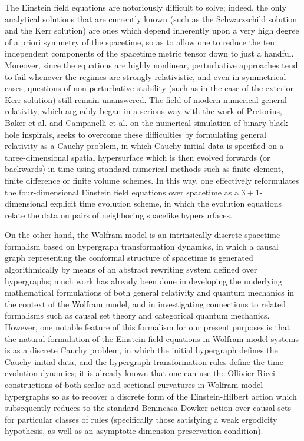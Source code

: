 \documentclass{article}
\begin{document}
The Einstein field equations are notoriously difficult to solve; indeed, the only analytical solutions that are currently known (such as the Schwarzschild solution and the Kerr solution) are ones which depend inherently upon a very high degree of a priori symmetry of the spacetime, so as to allow one to reduce the ten independent components of the spacetime metric tensor down to just a handful. Moreover, since the equations are highly nonlinear, perturbative approaches tend to fail whenever the regimes are strongly relativistic, and even in symmetrical cases, questions of non-perturbative stability (such as in the case of the exterior Kerr solution) still remain unanswered. The field of modern numerical general relativity, which arguably began in a serious way with the work of Pretorius\cite{pretorius}, Baker et al.\cite{baker} and Campanelli et al.\cite{campanelli} on the numerical simulation of binary black hole inspirals\cite{chu}\cite{centrella}, seeks to overcome these difficulties by formulating general relativity as a Cauchy problem, in which Cauchy initial data is specified on a three-dimensional spatial hypersurface which is then evolved forwards (or backwards) in time using standard numerical methods such as finite element, finite difference or finite volume schemes. In this way, one effectively reformulates the four-dimensional Einstein field equations over spacetime as a ${3 + 1}$-dimensional explicit time evolution scheme, in which the evolution equations relate the data on pairs of neighboring spacelike hypersurfaces.

On the other hand, the Wolfram model\cite{wolfram}\cite{wolfram2} is an intrinsically discrete spacetime formalism based on hypergraph transformation dynamics\cite{gorard}\cite{gorard2}, in which a causal graph representing the conformal structure of spacetime is generated algorithmically by means of an abstract rewriting system defined over hypergraphs; much work has already been done in developing the underlying mathematical formulations of both general relativity and quantum mechanics in the context of the Wolfram model, and in investigating connections to related formalisms such as causal set theory\cite{gorard3} and categorical quantum mechanics\cite{gorard4}. However, one notable feature of this formalism for our present purposes is that the natural formulation of the Einstein field equations in Wolfram model systems is as a discrete Cauchy problem, in which the initial hypergraph defines the Cauchy initial data, and the hypergraph transformation rules define the time evolution dynamics; it is already known that one can use the Ollivier-Ricci constructions\cite{ollivier} of both scalar and sectional curvatures in Wolfram model hypergraphs so as to recover a discrete form of the Einstein-Hilbert action which subsequently reduces to the standard Benincasa-Dowker action over causal sets\cite{benincasa} for particular classes of rules (specifically those satisfying a weak ergodicity hypothesis, as well as an asymptotic dimension preservation condition).
\end{document}
